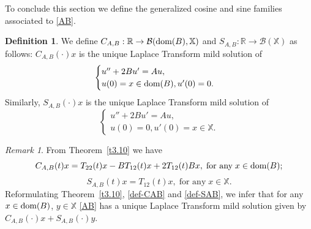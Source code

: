 \documentclass[11pt]{amsart}
\numberwithin{equation}{section}
\newcommand{\SAB}{S_{A,B}}
\newcommand{\CAB}{C_{A,B}}
\theoremstyle{remark}
\newtheorem{remark}[theorem]{Remark}
\theoremstyle{definition}
\newtheorem{definition}[theorem]{Definition}
\newcommand\bX{{\mathbb X}}
\newcommand{\dom}{\text{\rm{dom}}}
\begin{document}
To conclude this section we define the generalized cosine and sine families associated to \eqref{AB}.
\begin{definition}\label{d3.11}
	We define $C_{A,B} : \mathbb{R} \to \mathcal{B}(\dom(B),\bX)$ and $S_{A,B} : \mathbb{R} \to \mathcal{B}(\bX)$ as follows: $\CAB(\cdot)x$ is the unique Laplace Transform mild solution of 
	\begin{equation}\label{IVP-x0} 
		\begin{cases} u'' + 2Bu' = Au, \\ u(0) = x\in\dom(B), u'(0) = 0. \end{cases}
	\end{equation}
	Similarly, $\SAB(\cdot)x$ is the unique Laplace Transform mild solution of 
	\begin{equation}\label{IVP-0y} 
		\begin{cases} u'' + 2Bu' = Au, \\ u(0) =0, u'(0) =x\in\bX. \end{cases}
	\end{equation}
\end{definition}
\begin{remark}\label{r3.12} From Theorem~\ref{t3.10} we have
	\begin{equation}\label{def-CAB}
		\CAB(t)x = T_{22}(t)x - BT_{12}(t)x + 2T_{12}(t)Bx,\;\mbox{for any}\; x \in \dom(B);
	\end{equation}
	\begin{equation}\label{def-SAB}
		\SAB(t)x = T_{12}(t)x,\;\mbox{for any}\;x\in\bX. 
	\end{equation}
	Reformulating Theorem~\ref{t3.10}, \eqref{def-CAB} and \eqref{def-SAB}, we infer that for any $x\in\dom(B)$, $y\in\bX$ \eqref{AB} has a unique Laplace Transform mild solution given by $\CAB(\cdot)x+\SAB(\cdot)y$.
\end{remark}
\end{document}
